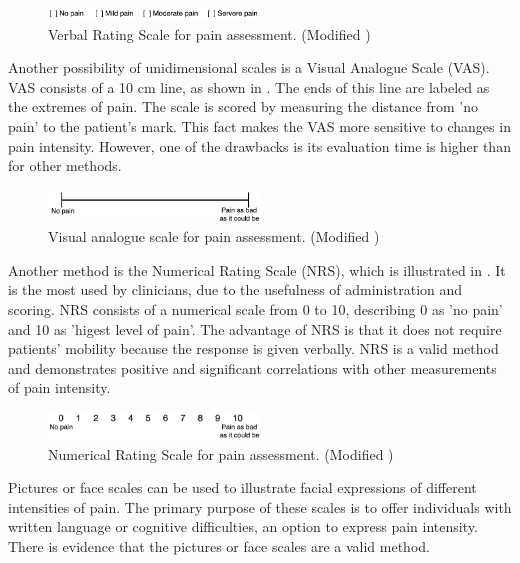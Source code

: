 \begin{figure}[H]
	\includegraphics[width=0.5\textwidth]{figures/VRS.png} 
	\caption{Verbal Rating Scale for pain assessment. (Modified \cite{Jensen2001})}
	\label{fig:VRS}  
\end{figure}   

Another possibility of unidimensional scales is a Visual Analogue Scale (VAS). VAS consists of a 10 cm line, as shown in . The ends of this line are labeled as the extremes of pain. The scale is scored by measuring the distance from 'no pain' to the patient's mark. This fact makes the VAS more sensitive to changes in pain intensity. However, one of the drawbacks is its evaluation time is higher than for other methods.~\cite{Jensen2001} 

\begin{figure}[H]
	\includegraphics[width=0.5\textwidth]{figures/VAS.png} 
	\caption{Visual analogue scale for pain assessment. (Modified \cite{Jensen2001})}
	\label{fig:VAS}  
\end{figure}   

Another method is the Numerical Rating Scale (NRS), which is illustrated in . It is the most used by clinicians, due to the usefulness of administration and scoring. \cite{Fillingim2016} NRS consists of a numerical scale from 0 to 10, describing 0 as 'no pain' and  10 as 'higest level of pain'. The advantage of NRS is that it does not require patients' mobility because the response is given verbally. NRS is a valid method and demonstrates positive and significant correlations with other measurements of pain intensity. \cite{Jensen2001} 

\begin{figure}[H]
	\includegraphics[width=0.5\textwidth]{figures/NRS.png} 
	\caption{Numerical Rating Scale for pain assessment. (Modified \cite{Jensen2001})}
	\label{fig:NRS}  
\end{figure}   

Pictures or face scales can be used to illustrate facial expressions of different intensities of pain. The primary purpose of these scales is to offer individuals with written language or cognitive difficulties, an option to express pain intensity. There is evidence that the pictures or face scales are a valid method. \cite{Jensen2001} 

